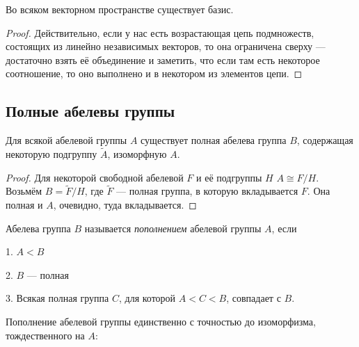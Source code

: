 \documentclass[10pt,a4paper,draft]{article}
\begin{document}
\begin{theorem}
Во всяком векторном пространстве существует базис.
\end{theorem}

\begin{proof} Действительно, если у нас есть возрастающая цепь
подмножеств, состоящих из линейно независимых векторов, то она
ограничена сверху --- достаточно взять её объединение и заметить,
что если там есть некоторое соотношение, то оно выполнено и в
некотором из элементов цепи.
\end{proof}

\subsection{Полные абелевы группы}

\begin{theorem}Для всякой
абелевой группы $A$ существует полная абелева группа $B$,
содержащая некоторую подгруппу $\widetilde{A}$, изоморфную $A$.
\end{theorem}

\begin{proof} Для некоторой свободной абелевой $F$ и её подгруппы $H$
$A\cong F/H$. Возьмём $B=\widetilde{F}/H$, где $\widetilde{F}$
--- полная группа, в которую вкладывается $F$. Она полная и $A$,
очевидно, туда вкладывается.\end{proof}

Абелева группа $B$ называется {\em пополнением} абелевой группы $A$, если
\par 1. $A<B$
\par 2. $B$ --- полная
\par 3. Всякая полная группа $C$, для которой $A<C<B$, совпадает с $B$.

\begin{theorem}
Пополнение абелевой группы единственно с точностью до изоморфизма,
тождественного на $A$:
\begin{figure}[h]
\hfil{}\hfil
\end{figure}\label{ab gr comp}
\end{theorem}
\end{document}
